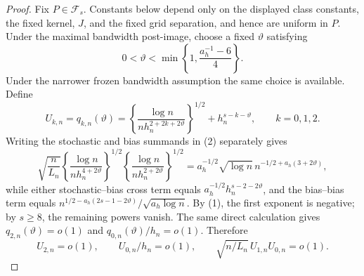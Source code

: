 \documentclass{article}
\begin{document}
\begin{proof}
Fix \(P\in\mathcal F_s\).  Constants below depend only on the displayed class constants, the fixed kernel, \(J\), and the fixed grid separation, and hence are uniform in \(P\).  Under the maximal bandwidth post-image, choose a fixed \(\vartheta\) satisfying
\[
 0<\vartheta<\min\left\{1,\frac{a_h^{-1}-6}{4}\right\}.
\tag{1}
\]
Under the narrower frozen bandwidth assumption the same choice is available.  Define
\[
 U_{k,n}=q_{k,n}(\vartheta)
 =\left\{\frac{\log n}{n h_n^{2+2k+2\vartheta}}\right\}^{1/2}
  +h_n^{s-k-\vartheta},\qquad k=0,1,2.
\tag{2}
\]
Writing the stochastic and bias summands in (2) separately gives
\[
 \sqrt{\frac n{L_n}}
 \left\{\frac{\log n}{n h_n^{4+2\vartheta}}\right\}^{1/2}
 \left\{\frac{\log n}{n h_n^{2+2\vartheta}}\right\}^{1/2}
 =a_h^{-1/2}\sqrt{\log n}\,
   n^{-1/2+a_h(3+2\vartheta)},
\]
while either stochastic--bias cross term equals
\(a_h^{-1/2}h_n^{s-2-2\vartheta}\), and the bias--bias term equals
\(n^{1/2-a_h(2s-1-2\vartheta)}/\sqrt{a_h\log n}\).
By (1), the first exponent is negative; by \(s\geq8\), the remaining powers vanish.  The same direct calculation gives
\(q_{2,n}(\vartheta)=o(1)\) and
\(q_{0,n}(\vartheta)/h_n=o(1)\).  Therefore
\[
 U_{2,n}=o(1),\qquad U_{0,n}/h_n=o(1),
 \qquad \sqrt{n/L_n}\,U_{1,n}U_{0,n}=o(1).
\tag{3}
\]


\end{proof}
\end{document}
